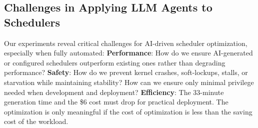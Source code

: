 \subsection{Challenges in Applying LLM Agents to Schedulers}

Our experiments reveal critical challenges for AI-driven scheduler optimization, especially when fully automated: \textbf{Performance}: How do we ensure AI-generated or configured schedulers outperform existing ones rather than degrading performance? \textbf{Safety}: How do we prevent kernel crashes, soft-lockups, stalls, or starvation while maintaining stability? How can we ensure only minimal privilege needed when development and deployment? \textbf{Efficiency}: The 33-minute generation time and the \$6 cost must drop for practical deployment. The optimization is only meaningful if the cost of optimization is less than the saving cost of the workload. 

